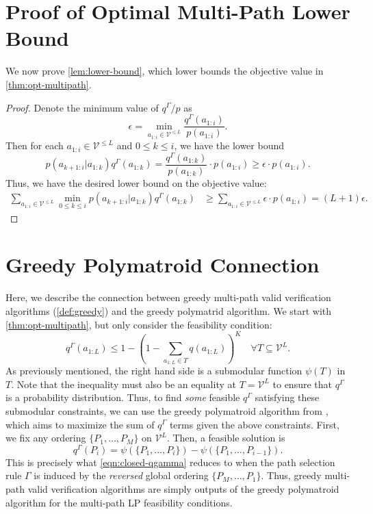 \documentclass{article}
\theoremstyle{plain}
\theoremstyle{definition}
\theoremstyle{remark}
\newcommand{\V}{\mathcal{V}}
\begin{document}
\section{Proof of Optimal Multi-Path Lower Bound}
\label{appendix:lower-bound}

We now prove \cref{lem:lower-bound}, which lower bounds the objective value in \cref{thm:opt-multipath}.

\begin{proof}
    Denote the minimum value of $q^\Gamma/p$ as
    \begin{equation}
        \epsilon = \min_{a_{1:i} \in \V^{\leq L}} \frac{q^\Gamma(a_{1:i})}{p(a_{1:i})}.
    \end{equation}
    Then for each $a_{1:i} \in \V^{\leq L}$ and $0 \leq k \leq i$, we have the lower bound
    \begin{equation}
        p(a_{k+1:i}|a_{1:k})q^\Gamma(a_{1:k}) = \frac{q^\Gamma(a_{1:k})}{p(a_{1:k})} \cdot p(a_{1:i}) \geq \epsilon \cdot p(a_{1:i}).
    \end{equation}
    Thus, we have the desired lower bound on the objective value:
    \begin{align}
        \sum_{a_{1:i} \in \V^{\leq L}} \min_{0 \leq k \leq i} p(a_{k+1:i}|a_{1:k})q^\Gamma(a_{1:k}) &\geq \sum_{a_{1:i} \in \V^{\leq L}}\epsilon \cdot p(a_{1:i})= (L+1)\epsilon.
    \end{align}
\end{proof}

\section{Greedy Polymatroid Connection}
\label{appendix:submodular-bv}

Here, we describe the connection between greedy multi-path valid verification algorithms (\cref{def:greedy}) and the greedy polymatrid algorithm. We start with \cref{thm:opt-multipath}, but only consider the feasibility condition:
\begin{equation}
    q^\Gamma(a_{1:L}) \leq 1-\left(1-\sum_{a_{1:L} \in T} q(a_{1:L})\right)^K \quad \forall T \subseteq \V^L.
\end{equation}
As previously mentioned, the right hand side is a submodular function $\psi(T)$ in $T$. Note that the inequality must also be an equality at $T=\V^L$ to ensure that $q^\Gamma$ is a probability distribution. Thus, to find \textit{some} feasible $q^\Gamma$ satisfying these submodular constraints, we can use the greedy polymatroid algorithm from \citet{schrijver2003combinatorial}, which aims to maximize the sum of $q^\Gamma$ terms given the above constraints. First, we fix any ordering $\{P_1,\ldots,P_M\}$ on $\V^L$. Then, a feasible solution is
\begin{equation}
    q^\Gamma(P_i) = \psi(\{P_1,\ldots,P_i\}) - \psi(\{P_1,\ldots,P_{i-1}\}).
\end{equation}
This is precisely what \cref{eqn:closed-qgamma} reduces to when the path selection rule $\Gamma$ is induced by the \textit{reversed} global ordering $\{P_M,\ldots,P_1\}$. Thus, greedy multi-path valid verification algorithms are simply outputs of the greedy polymatroid algorithm for the multi-path LP feasibility conditions.
\end{document}
